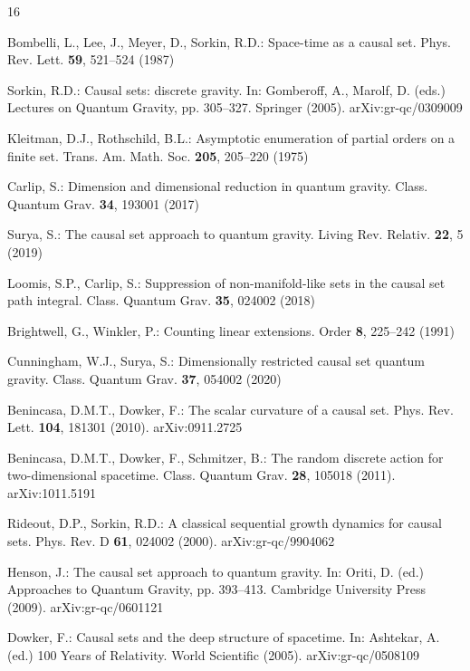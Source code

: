 \documentclass[11pt,a4paper]{article}
\begin{document}
\begin{thebibliography}{16}

Bombelli, L., Lee, J., Meyer, D., Sorkin, R.D.: Space-time as a causal set. Phys. Rev. Lett. \textbf{59}, 521--524 (1987)

Sorkin, R.D.: Causal sets: discrete gravity. In: Gomberoff, A., Marolf, D. (eds.) Lectures on Quantum Gravity, pp. 305--327. Springer (2005). arXiv:gr-qc/0309009

Kleitman, D.J., Rothschild, B.L.: Asymptotic enumeration of partial orders on a finite set. Trans. Am. Math. Soc. \textbf{205}, 205--220 (1975)

Carlip, S.: Dimension and dimensional reduction in quantum gravity. Class. Quantum Grav. \textbf{34}, 193001 (2017)

Surya, S.: The causal set approach to quantum gravity. Living Rev. Relativ. \textbf{22}, 5 (2019)

Loomis, S.P., Carlip, S.: Suppression of non-manifold-like sets in the causal set path integral. Class. Quantum Grav. \textbf{35}, 024002 (2018)

Brightwell, G., Winkler, P.: Counting linear extensions. Order \textbf{8}, 225--242 (1991)

Cunningham, W.J., Surya, S.: Dimensionally restricted causal set quantum gravity. Class. Quantum Grav. \textbf{37}, 054002 (2020)

Benincasa, D.M.T., Dowker, F.: The scalar curvature of a causal set. Phys. Rev. Lett. \textbf{104}, 181301 (2010). arXiv:0911.2725

Benincasa, D.M.T., Dowker, F., Schmitzer, B.: The random discrete action for two-dimensional spacetime. Class. Quantum Grav. \textbf{28}, 105018 (2011). arXiv:1011.5191

Rideout, D.P., Sorkin, R.D.: A classical sequential growth dynamics for causal sets. Phys. Rev. D \textbf{61}, 024002 (2000). arXiv:gr-qc/9904062

Henson, J.: The causal set approach to quantum gravity. In: Oriti, D. (ed.) Approaches to Quantum Gravity, pp. 393--413. Cambridge University Press (2009). arXiv:gr-qc/0601121

Dowker, F.: Causal sets and the deep structure of spacetime. In: Ashtekar, A. (ed.) 100 Years of Relativity. World Scientific (2005). arXiv:gr-qc/0508109


\end{thebibliography}
\end{document}
